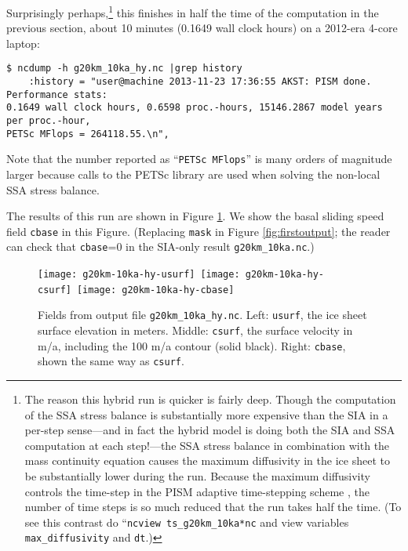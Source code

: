 Surprisingly perhaps,\footnote{The reason this hybrid run is quicker is fairly deep.  Though the computation of the SSA stress balance is substantially more expensive than the SIA in a per-step sense---and in fact the hybrid model is doing both the SIA and SSA computation at each step!---the SSA stress balance in combination with the mass continuity equation causes the maximum diffusivity in the ice sheet to be substantially lower during the run.  Because the maximum diffusivity controls the time-step in the PISM adaptive time-stepping scheme \cite{BBL}, the number of time steps is so much reduced that the run takes half the time.  (To see this contrast do ``\texttt{ncview ts_g20km_10ka*nc} and view variables \texttt{max_diffusivity} and \texttt{dt}.) } this finishes in half the time of the computation in the previous section, about 10 minutes (0.1649 wall clock hours) on a 2012-era 4-core laptop:
\begin{verbatim}
$ ncdump -h g20km_10ka_hy.nc |grep history
    :history = "user@machine 2013-11-23 17:36:55 AKST: PISM done.  Performance stats:
0.1649 wall clock hours, 0.6598 proc.-hours, 15146.2867 model years per proc.-hour,
PETSc MFlops = 264118.55.\n",
\end{verbatim}
Note that the number reported as ``\texttt{PETSc MFlops}'' is many orders of magnitude larger because calls to the PETSc library are used when solving the non-local SSA stress balance.

The results of this run are shown in Figure \ref{fig:secondoutputcoarse}.  We show the basal sliding speed field \texttt{cbase} in this Figure.  (Replacing \texttt{mask} in Figure \ref{fig:firstoutput}; the reader can check that \texttt{cbase}=0 in the SIA-only result \texttt{g20km_10ka.nc}.)

\begin{figure}[ht]
\centering
\mbox{\texttt{[image: g20km-10ka-hy-usurf]} \texttt{[image: g20km-10ka-hy-csurf]} \texttt{[image: g20km-10ka-hy-cbase]}}
\caption{Fields from output file \texttt{g20km_10ka_hy.nc}.  Left: \texttt{usurf}, the ice sheet surface elevation in meters.  Middle: \texttt{csurf}, the surface velocity in m/a, including the 100 m/a contour (solid black).  Right: \texttt{cbase}, shown the same way as \texttt{csurf}.}
\label{fig:secondoutputcoarse}
\end{figure}

